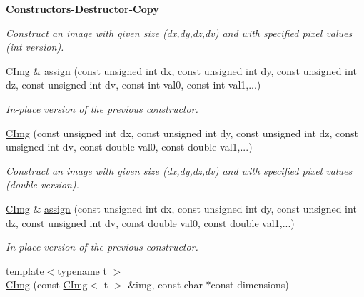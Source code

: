 \begin{Indent}{\bf Constructors-\/\-Destructor-\/\-Copy}
\begin{DoxyCompactItemize}
\begin{DoxyCompactList}\small\item\em Construct an image with given size ({\ttfamily dx},{\ttfamily dy},{\ttfamily dz},{\ttfamily dv}) and with specified pixel values (int version). \end{DoxyCompactList}\item 
\hypertarget{structcimg__library_1_1_c_img_ad724d7b33600092b400f3d3c2582da7a}{\hyperlink{structcimg__library_1_1_c_img}{C\-Img} \& \hyperlink{structcimg__library_1_1_c_img_ad724d7b33600092b400f3d3c2582da7a}{assign} (const unsigned int dx, const unsigned int dy, const unsigned int dz, const unsigned int dv, const int val0, const int val1,...)}\label{structcimg__library_1_1_c_img_ad724d7b33600092b400f3d3c2582da7a}

\begin{DoxyCompactList}\small\item\em In-\/place version of the previous constructor. \end{DoxyCompactList}\item 
\hypertarget{structcimg__library_1_1_c_img_a764d9bfaeb3a2a37155597dda9200752}{\hyperlink{structcimg__library_1_1_c_img_a764d9bfaeb3a2a37155597dda9200752}{C\-Img} (const unsigned int dx, const unsigned int dy, const unsigned int dz, const unsigned int dv, const double val0, const double val1,...)}\label{structcimg__library_1_1_c_img_a764d9bfaeb3a2a37155597dda9200752}

\begin{DoxyCompactList}\small\item\em Construct an image with given size ({\ttfamily dx},{\ttfamily dy},{\ttfamily dz},{\ttfamily dv}) and with specified pixel values (double version). \end{DoxyCompactList}\item 
\hypertarget{structcimg__library_1_1_c_img_ad01d34e8c1f64874bbba856ba853183f}{\hyperlink{structcimg__library_1_1_c_img}{C\-Img} \& \hyperlink{structcimg__library_1_1_c_img_ad01d34e8c1f64874bbba856ba853183f}{assign} (const unsigned int dx, const unsigned int dy, const unsigned int dz, const unsigned int dv, const double val0, const double val1,...)}\label{structcimg__library_1_1_c_img_ad01d34e8c1f64874bbba856ba853183f}

\begin{DoxyCompactList}\small\item\em In-\/place version of the previous constructor. \end{DoxyCompactList}\item 
\hypertarget{structcimg__library_1_1_c_img_a72bf5c28db85032a5857d0cd75cff623}{{\footnotesize template$<$typename t $>$ }\\\hyperlink{structcimg__library_1_1_c_img_a72bf5c28db85032a5857d0cd75cff623}{C\-Img} (const \hyperlink{structcimg__library_1_1_c_img}{C\-Img}$<$ t $>$ \&img, const char $\ast$const dimensions)}\label{structcimg__library_1_1_c_img_a72bf5c28db85032a5857d0cd75cff623}


\end{DoxyCompactItemize}
\end{Indent}
